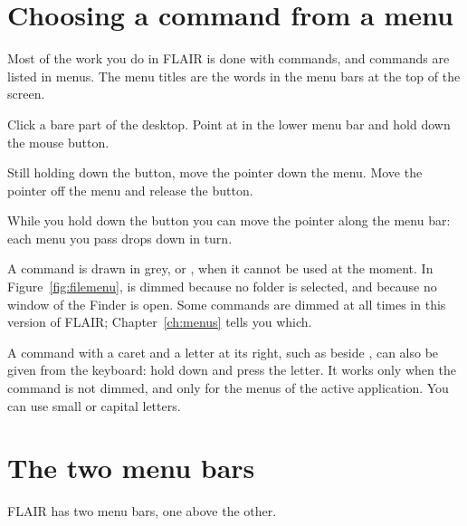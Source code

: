 \section{Choosing a command from a menu}
Most of the work you do in FLAIR is done with commands, and commands are
listed in menus.  The menu titles are the words in the menu bars at the top
of the screen.
\begin{TaskSteps}
\Step Click a bare part of the desktop.
\Step Point at  in the lower menu bar and hold down the
mouse button.
\end{TaskSteps}


\begin{TaskSteps}[resume]
\Step Still holding down the button, move the pointer down the menu.
\Step Move the pointer off the menu and release the button.
\end{TaskSteps}
While you hold down the button you can move the pointer along the menu bar:
each menu you pass drops down in turn.

A command is drawn in grey, or ,
when it cannot be used at the moment.  In Figure~\ref{fig:filemenu},
 is dimmed because no folder is selected, and
 because no window of the Finder is open.  Some
commands are dimmed at all times in this version of FLAIR; Chapter~\ref{ch:menus} tells
you which.

A command with a caret and a letter at its
right, such as  beside , can also be given
from the keyboard: hold down  and press the letter.  It works only
when the command is not dimmed, and only for the menus of the active
application.  You can use small or capital letters.

\section{The two menu bars}
FLAIR has two menu bars, one above the other.

